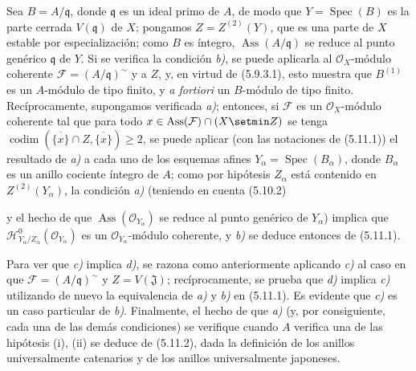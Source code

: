 Sea $B=A/\mathfrak q$, donde $\mathfrak q$ es un ideal primo de $A$, de modo
que $Y=\operatorname{Spec}(B)$ es la parte cerrada $V(\mathfrak q)$ de $X$;
pongamos $Z=Z^{(2)}(Y)$, que es una parte de $X$ estable por especialización;
como $B$ es íntegro, $\operatorname{Ass}(A/\mathfrak q)$ se reduce al punto
genérico $\mathfrak q$ de $Y$. Si se verifica la condición \emph{b)}, se puede
aplicarla al $\mathcal O_X$-módulo coherente
$\mathcal F=(A/\mathfrak q)^\sim$ y a $Z$, y, en virtud de (5.9.3.1), esto
muestra que $B^{(1)}$ es un $A$-módulo de tipo finito, y \emph{a fortiori} un
$B$-módulo de tipo finito. Recíprocamente, supongamos verificada \emph{a)}; entonces, si
$\mathcal F$ es un $\mathcal O_X$-módulo coherente tal que para todo
$x\in\operatorname{Ass}(\mathcal F)\cap(X\setmin Z)$ se tenga
$\operatorname{codim}(\overline{\{x\}}\cap Z,\overline{\{x\}})\geq2$, se puede
aplicar (con las notaciones de (5.11.1)) el resultado de \emph{a)} a cada uno de los esquemas afines
$Y_\alpha=\operatorname{Spec}(B_\alpha)$, donde $B_\alpha$ es un anillo cociente
íntegro de $A$; como por hipótesis $Z_\alpha$ está contenido
en $Z^{(2)}(Y_\alpha)$, la condición \emph{a)} (teniendo en cuenta (5.10.2)


y el hecho de que $\operatorname{Ass}(\mathcal O_{Y_\alpha})$ se reduce al punto
genérico de $Y_\alpha$) implica que
$\mathcal H^0_{Y_\alpha/Z_\alpha}(\mathcal O_{Y_\alpha})$ es un
$\mathcal O_{Y_\alpha}$-módulo coherente, y \emph{b)} se deduce entonces de (5.11.1).

Para ver que \emph{c)} implica \emph{d)}, se razona como anteriormente aplicando \emph{c)} al
caso en que $\mathcal F=(A/\mathfrak q)^\sim$ y $Z=V(\mathfrak J)$;
recíprocamente, se prueba que \emph{d)} implica \emph{c)} utilizando de nuevo la equivalencia de
\emph{a)} y \emph{b)} en (5.11.1). Es evidente que \emph{c)} es un caso particular de \emph{b)}.
Finalmente, el hecho de que \emph{a)} (y, por consiguiente, cada una de las demás condiciones) se verifique
cuando $A$ verifica una de las hipótesis (i), (ii) se deduce de (5.11.2), dada la
definición de los anillos universalmente catenarios y de los anillos
universalmente japoneses.

